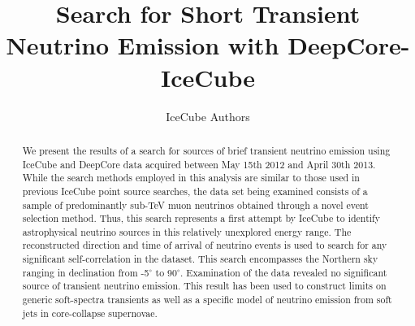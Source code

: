 \documentclass[manuscript]{aastex}
\begin{document}
\title{Search for Short Transient Neutrino Emission with DeepCore-IceCube}
\author{IceCube Authors}

\begin{abstract}
We present the results of a search for sources of brief transient neutrino emission using IceCube and DeepCore data acquired between May 15th 2012 and April 30th 2013. While the search methods employed in this analysis are similar to those used in previous IceCube point source searches, the data set being examined consists of a sample of predominantly sub-TeV muon neutrinos obtained through a novel event selection method. Thus, this search represents a first attempt by IceCube to identify astrophysical neutrino sources in this relatively unexplored energy range. The reconstructed direction and time of arrival of neutrino events is used to search for any significant self-correlation in the dataset. This search encompasses the Northern sky ranging in declination from -5$^{\circ}$ to 90$^{\circ}$. Examination of the data revealed no significant source of transient neutrino emission. This result has been used to construct limits on generic soft-spectra transients as well as a specific model of neutrino emission from soft jets in core-collapse supernovae.
\end{abstract}


\end{document}
